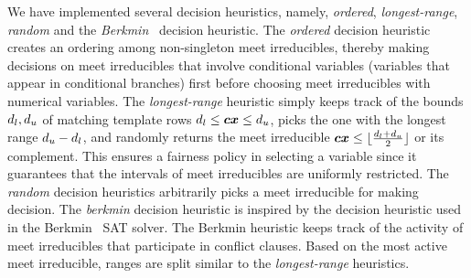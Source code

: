 
We have implemented several decision heuristics, namely, {\em ordered}, 
{\em longest-range}, {\em random} and the 
{\em Berkmin}~\cite{eugoldberg07} decision heuristic.  
The {\em ordered} decision heuristic creates an ordering among non-singleton 
meet irreducibles, thereby making decisions on meet irreducibles that involve 
conditional variables (variables that appear in conditional branches) first 
before choosing meet irreducibles with numerical variables.  
%
The {\em longest-range} heuristic simply keeps track of the bounds
$d_l,d_u$ of matching template rows $d_l\leq
{\boldsymbol c}{\boldsymbol x}\leq d_u$, picks the one with the longest range
$d_u-d_l$, and randomly returns the meet irreducible
${\boldsymbol c}{\boldsymbol x}\leq
\lfloor\frac{d_l+d_u}{2}\rfloor$ or its
complement. This ensures a fairness policy in selecting a variable
since it guarantees that the intervals of meet irreducibles are
uniformly restricted.
%
The {\em random} decision heuristics arbitrarily picks a meet irreducible  
for making decision. 
%
%
The {\em berkmin} decision heuristic is inspired by the 
decision heuristic used in the Berkmin~\cite{eugoldberg07} SAT solver.  
The Berkmin heuristic %
keeps track of the activity of %
meet irreducibles that participate in conflict clauses. 
Based on the most active meet irreducible, ranges are split 
similar to the {\em longest-range} heuristics.
%
